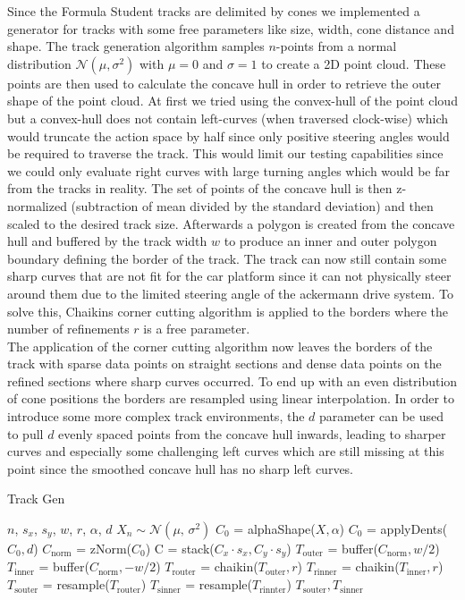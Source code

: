 Since the Formula Student tracks are delimited by cones we implemented a generator for tracks with some free parameters like size, width, cone distance and shape.
The track generation algorithm samples $n$-points from a normal distribution $\mathcal{N}(\mu, \sigma^2)$ with $\mu = 0$ and $\sigma = 1$ to create a 2D point cloud. These points are then used to calculate the concave hull in order to retrieve the outer shape of the point cloud. At first we tried using the convex-hull of the point cloud but a convex-hull does not contain left-curves (when traversed clock-wise) which would truncate the action space by half since only positive steering angles would be required to traverse the track. This would limit our testing capabilities since we could only evaluate right curves with large turning angles which would be far from the tracks in reality. The set of points of the concave hull is then z-normalized (subtraction of mean divided by the standard deviation) and then scaled to the desired track size.
Afterwards a polygon is created from the concave hull and buffered by the track width $w$ to produce an inner and outer polygon boundary defining the border of the track. The track can now still contain some sharp curves that are not fit for the car platform since it can not physically steer around them due to the limited steering angle of the ackermann drive system. To solve this, Chaikins corner cutting algorithm \cite{chaikin1974algorithm} is applied to the borders where the number of refinements $r$ is a free parameter.\\
\newline
The application of the corner cutting algorithm now leaves the borders of the track with sparse data points on straight sections and dense data points on the refined sections where sharp curves occurred. To end up with an even distribution of cone positions the borders are resampled using linear interpolation.
In order to introduce some more complex track environments, the $d$ parameter can be used to pull $d$ evenly spaced points from the concave hull inwards, leading to sharper curves and especially some challenging left curves which are still missing at this point since the smoothed concave hull has no sharp left curves.

\begin{algorithm}[tb]
\caption{Track Gen}
\label{alg:track-gen}
\begin{algorithmic}
 $n$, $s_x$, $s_y$, $w$, $r$, $\alpha$, $d$
\State $X_n \sim \mathcal{N}(\mu,\,\sigma^{2})$
\State $C_0$ = alphaShape($X, \alpha$)
\State $C_0$ = applyDents($C_0, d$)
\State $C_\text{norm}$ = zNorm($C_0$)
\State C = stack($C_x \cdot s_x, C_y \cdot s_y$)
\State $T_\text{outer}$ = buffer($C_\text{norm}, w/2$)
\State $T_\text{inner}$ = buffer($C_\text{norm}, -w/2$)
\State $T_\text{router}$ = chaikin($T_\text{outer}, r$)
\State $T_\text{rinner}$ = chaikin($T_\text{inner}, r$)
\State $T_\text{souter}$ = resample($T_\text{router}$)
\State $T_\text{sinner}$ = resample($T_\text{rinnter}$)
 $T_\text{souter}, T_\text{sinner}$
\end{algorithmic}
\end{algorithm}

